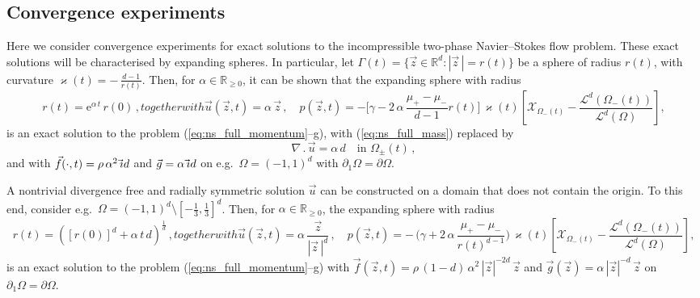 \documentclass[a4paper,12pt,onecolumn]{article}
\newcommand{\R}{\mathbb R}
\newcommand{\vol}{\mathcal{L}^d}
\newcommand{\bigchi}{\ensuremath{\mathrm{\mathcal{X}}}}
\newcommand{\charfcn}[1]{\bigchi_{#1}} %
\newcommand{\id}{\rm id}
\begin{document}
\subsection{Convergence experiments}\label{sec:ns_convergence_results}
Here we consider convergence experiments for exact solutions to the
incompressible two-phase Navier--Stokes flow problem. These exact solutions
will be characterised by expanding spheres. In particular, let
$\Gamma(t) = \{ \vec z \in \R^d : |\vec z\,| = r(t)\}$ be a sphere of radius
$r(t)$, with curvature $\varkappa(t) = -\,\frac{d-1}{r(t)}$.
Then, for $\alpha \in \R_{\geq0}$, it can be shown that the expanding sphere
with radius
\begin{subequations}
\begin{equation} \label{eq:ns_sol1a}
r(t) = \mathrm{e}^{\alpha\,t}\,r(0)\,,
\end{equation}
together with
\begin{equation} \label{eq:ns_sol1b}
\vec u(\vec z, t) = \alpha\,\vec z \,, \quad
p(\vec z, t) = -\bigg[\gamma - 2\,\alpha\,\frac{\mu_+ - \mu_-}
{d-1}r(t)\bigg]\,\varkappa(t)\left[ \charfcn{\Omega_-(t)} -
\frac{\vol(\Omega_-(t))}{\vol(\Omega)}\right],
\end{equation}
\end{subequations}
is an exact solution to the problem (\ref{eq:ns_full_momentum}--g), with
(\ref{eq:ns_full_mass}) replaced by
\[
\nabla\,.\,\vec u = \alpha\,d \quad \mbox{in } \Omega_\pm(t)\,,
\]
and with $\vec f(\cdot, t) = \rho\,\alpha^2\,\vec\id$ and
$\vec g = \alpha\,\vec\id$ on e.g.\ $\Omega = (-1,1)^d$ with
$\partial_1\Omega=\partial\Omega$.

A nontrivial divergence free and radially symmetric solution $\vec u$
can be constructed on a domain that does not contain the origin. To this end,
consider e.g.\ $\Omega = (-1,1)^d \setminus [-\frac13, \frac13]^d$.
Then, for $\alpha \in \R_{\geq0}$, the expanding sphere with radius
\begin{subequations}
\begin{equation} \label{eq:ns_sol2a}
r(t) = ([r(0)]^d + \alpha\,t\,d)^\frac1d \,,
\end{equation}
together with
\begin{equation} \label{eq:ns_sol2b}
\vec u(\vec z, t) = \alpha\,\frac{\vec z}{|\vec z\,|^d}\,, \quad
p(\vec z, t) = -\,\bigg(\gamma +2\,\alpha\,\frac{\mu_+ - \mu_-}
{r(t)^{d-1}}\bigg)\,\varkappa(t)\left[ \charfcn{\Omega_-(t)} -
\frac{\vol(\Omega_-(t))}{\vol(\Omega)}\right],
\end{equation}
\end{subequations}
is an exact solution to the problem (\ref{eq:ns_full_momentum}--g) with
$\vec f(\vec z, t) = \rho\,(1-d)\,\alpha^2\,|\vec z|^{-2d}\,\vec z$ and
$\vec g(\vec z) = \alpha\,|\vec z|^{-d}\,\vec z$ on
$\partial_1\Omega=\partial\Omega$.
\end{document}
